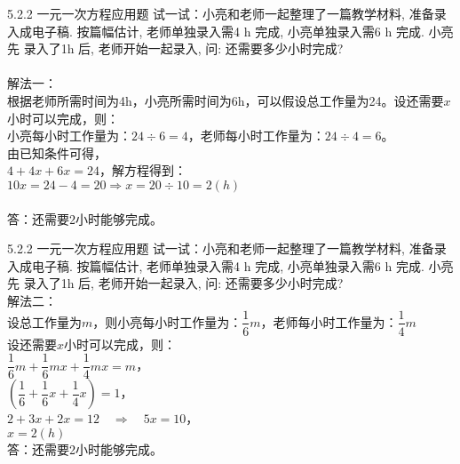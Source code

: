 \documentclass[aspectratio=169]{ctexbeamer} %
\date{\today}
\begin{document}
\begin{frame}[t]{5.2.2 一元一次方程应用题}
试一试：小亮和老师一起整理了一篇教学材料, 准备录入成电子稿. 按篇幅估计, 老师单独录入需4 h 完成, 小亮单独录入需6 h 完成. 小亮先
录入了1h 后, 老师开始一起录入, 问: 还需要多少小时完成? \\
\pause
\vspace{1em} \\
解法一：\\
根据老师所需时间为4h，小亮所需时间为6h，可以假设总工作量为24。设还需要$x$小时可以完成，则：\\
小亮每小时工作量为：$24 \div 6 = 4$，老师每小时工作量为：$24 \div 4 = 6$。\\
由已知条件可得，\\
$4 + 4x + 6x = 24$，解方程得到：\\
$10x = 24 - 4 = 20 \Rightarrow x = 20 \div 10 = 2(h)$ \\
\vspace{1em} \\
答：还需要2小时能够完成。
\end{frame}

\begin{frame}[t]{5.2.2 一元一次方程应用题}
试一试：小亮和老师一起整理了一篇教学材料, 准备录入成电子稿. 按篇幅估计, 老师单独录入需4 h 完成, 小亮单独录入需6 h 完成. 小亮先
录入了1h 后, 老师开始一起录入, 问: 还需要多少小时完成? \\
\pause
解法二：\\
设总工作量为$m$，则小亮每小时工作量为：$\dfrac{1}{6}m$，老师每小时工作量为：$\dfrac{1}{4}m$\\
设还需要$x$小时可以完成，则：\\
$\dfrac{1}{6}m + \dfrac{1}{6}mx + \dfrac{1}{4}mx = m$，\\
$(\dfrac{1}{6} + \dfrac{1}{6}x + \dfrac{1}{4}x) = 1$， \\
$2 + 3x + 2x = 12 \quad \Rightarrow \quad 5x = 10$， \\
$x = 2(h)$ \\
答：还需要2小时能够完成。
\end{frame}
\end{document}
